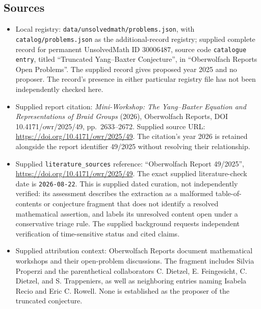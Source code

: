 \documentclass[11pt]{article}
\begin{document}
\subsection{Sources}
\begin{itemize}
\item Local registry: \texttt{data/unsolvedmath/problems.json}, with \texttt{catalog/problems.json} as the additional-record registry; supplied complete record for permanent UnsolvedMath ID \(30006487\), source code \texttt{catalogue entry}, titled ``Truncated Yang--Baxter Conjecture'', in ``Oberwolfach Reports Open Problems''. The supplied record gives proposed year 2025 and no proposer. The record's presence in either particular registry file has not been independently checked here.
\item Supplied report citation: \emph{Mini-Workshop: The Yang--Baxter Equation and Representations of Braid Groups} (2026), Oberwolfach Reports, DOI 10.4171/owr/2025/49, pp.\ 2633--2672. Supplied source URL: \url{https://doi.org/10.4171/owr/2025/49}. The citation's year 2026 is retained alongside the report identifier 49/2025 without resolving their relationship.
\item Supplied \texttt{literature\_sources} reference: ``Oberwolfach Report 49/2025'', \url{https://doi.org/10.4171/owr/2025/49}. The exact supplied literature-check date is \texttt{2026-08-22}. This is supplied dated curation, not independently verified: its assessment describes the extraction as a malformed table-of-contents or conjecture fragment that does not identify a resolved mathematical assertion, and labels its unresolved content open under a conservative triage rule. The supplied background requests independent verification of time-sensitive status and cited claims.
\item Supplied attribution context: Oberwolfach Reports document mathematical workshops and their open-problem discussions. The fragment includes Silvia Properzi and the parenthetical collaborators C. Dietzel, E. Feingesicht, C. Dietzel, and S. Trappeniers, as well as neighboring entries naming Isabela Recio and Eric C. Rowell. None is established as the proposer of the truncated conjecture.
\end{itemize}
\end{document}
